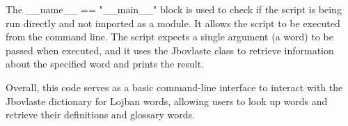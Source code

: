     The \_\_name\_\_ == "\_\_main\_\_" block is used to check if the script is being run directly and not imported as a module. It allows the script to be executed from the command line. The script expects a single argument (a word) to be passed when executed, and it uses the Jbovlaste class to retrieve information about the specified word and prints the result.

Overall, this code serves as a basic command-line interface to interact with the Jbovlaste dictionary for Lojban words, allowing users to look up words and retrieve their definitions and glossary words.